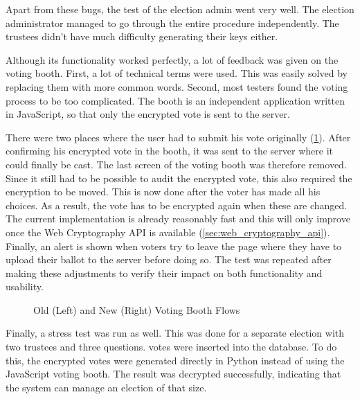 \par Apart from these bugs, the test of the election admin went very well. The election administrator managed to go through the entire procedure independently. The trustees didn't have much difficulty generating their keys either.

\par Although its functionality worked perfectly, a lot of feedback was given on the voting booth. First, a lot of technical terms were used. This was easily solved by replacing them with more common words. Second, most testers found the voting process to be too complicated. The booth is an independent application written in JavaScript, so that only the encrypted vote is sent to the server.

\par There were two places where the user had to submit his vote originally (\ref{fig:be:voting_booth_flows}). After confirming his encrypted vote in the booth, it was sent to the server where it could finally be cast. The last screen of the voting booth was therefore removed. Since it still had to be possible to audit the encrypted vote, this also required the encryption to be moved. This is now done after the voter has made all his choices. As a result, the vote has to be encrypted again when these are changed. The current implementation is already reasonably fast and this will only improve once the Web Cryptography API is available (\ref{sec:web_cryptography_api}). Finally, an alert is shown when voters try to leave the page where they have to upload their ballot to the server before doing so. The test was repeated after making these adjustments to verify their impact on both functionality and usability.
 
\begin{figure}
  \centering
  \begin{minipage}{.45\linewidth}
    \centering
    \scalebox{.6}{}
  \end{minipage}
  \quad
  \begin{minipage}{.45\linewidth}
    \centering
    \scalebox{.6}{}
  \end{minipage}
  \caption{Old (Left) and New (Right) Voting Booth Flows}
  \label{fig:be:voting_booth_flows}
\end{figure}

\par Finally, a stress test was run as well. This was done for a separate election with two trustees and three questions.  votes were inserted into the database. To do this, the encrypted votes were generated directly in Python instead of using the JavaScript voting booth. The result was decrypted successfully, indicating that the system can manage an election of that size.

